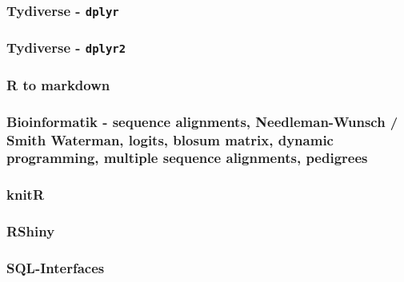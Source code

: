 \documentclass[paper=A4, pagesize, DIV=calc, smallheadings,
fontsize=11pt, expansion=false]{scrreprt}
\begin{document}
\subsubsection{Tydiverse - \texttt{dplyr}}

\subsubsection{Tydiverse - \texttt{dplyr2}}

\subsubsection{R to markdown}

\subsubsection{Bioinformatik - sequence alignments, Needleman-Wunsch / Smith Waterman, logits, blosum matrix, dynamic 
  programming, multiple sequence alignments, pedigrees}

\subsubsection{knitR}

\subsubsection{RShiny}

\subsubsection{SQL-Interfaces}
\end{document}
